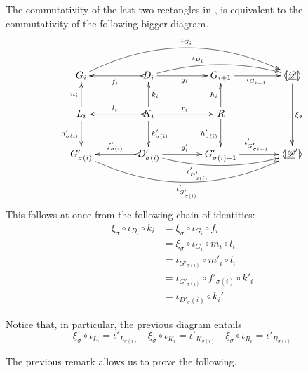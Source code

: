 \documentclass[a4paper,UKenglish,cleveref,pdftex, thm-restate,numberwithinsect]{lipics}
\newcommand{\dder}[1]{\mathscr{#1}}
\newcommand{\der}[1]{\underline{\dder{#1}}}
\newcommand{\lpro}{\langle \hspace{-1.85pt}[}
\newcommand{\rpro}{]\hspace{-1.85pt}\rangle}
\newcommand{\tpro}[1]{\lpro \der{#1}\rpro}
\begin{document}
\begin{remark}
The commutativity of the last two rectangles in , is equivalent to the commutativity of the following bigger diagram.		
\[\xymatrix@C=40pt{G_i\ar@/^1cm/[rrr]^{\iota_{G_{i}}}&D_i\ar@/^.4cm/[rr]^(.35){\iota_{D_i}} \ar[r]_{g_i} \ar@{>->}[l]^{f_i}&G_{i+1} \ar[r]_{\iota_{G_{i+1}}}&\tpro{D} \ar[dd]^{\xi_\sigma}\\  L_i \ar[u]^{n_i} \ar[d]_{n'_{\sigma(i)}}& K_i \ar[d]^{k'_{\sigma(i)}} \ar[u]_{k_i} \ar[r]^{r_i} \ar@{>->}[l]_{l_i} &R\ar[u]^{h_i} \ar[d]_{h'_{\sigma(i)}}\\G'_{\sigma(i)}\ar@/_1cm/[rrr]_{\iota'_{G'_{\sigma(i)}}} &D'_{\sigma(i)}\ar@{>->}[l]_{f'_{\sigma(i)}} \ar[r]^{g'_i} \ar@/_.4cm/[rr]_(.35){\iota'_{D'_{\sigma(i)}}}&G'_{\sigma(i)+1} \ar[r]^{\iota'_{G'_{\sigma{i}+1}}}& \lpro\der{D}' \rpro }\]
This follows at once from the following chain of identities:
\begin{align*}
	\xi_\sigma \circ \iota_{D_i}\circ k_i&=\xi_\sigma \circ \iota_{G_{i}} \circ f_i\\&= \xi_\sigma \circ \iota_{G_{i}}\circ m_i \circ l_i\\&=\iota_{G'_{\sigma(i)}}\circ m'_i\circ l_i\\&=\iota_{G'_{\sigma(i)}}\circ f'_{\sigma(i)}\circ k'_i\\&=\iota_{D'_\sigma(i)}\circ k_i'
\end{align*}
\end{remark}

\begin{remark}\label{rem:coproj}
Notice that, in particular, the previous diagram entails
		\[\xi_\sigma \circ \iota_{L_i}=\iota'_{L_{\sigma(i)}} \quad \xi_\sigma \circ \iota_{K_i}=\iota'_{K_{\sigma(i)}} \quad \xi_\sigma \circ \iota_{R_i}=\iota'_{R_{\sigma(i)}} \]
\end{remark}

The previous remark allows us to prove the following.
\end{document}
